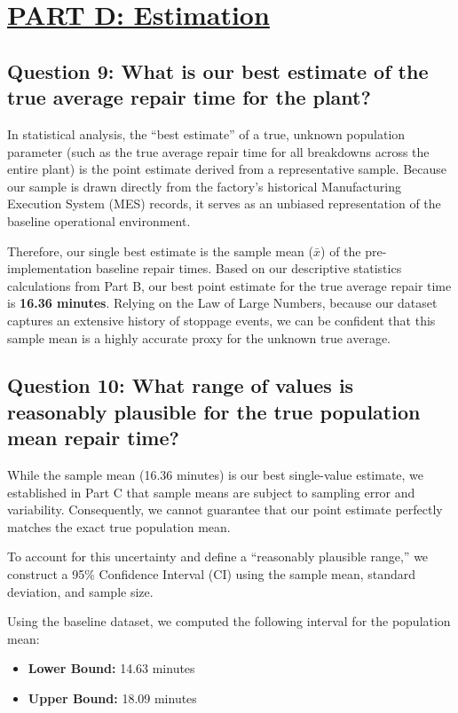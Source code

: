 \section*{\underline{PART D: Estimation}}


\subsection*{Question 9: What is our best estimate of the true average repair time for the plant?}

In statistical analysis, the ``best estimate'' of a true, unknown population parameter (such as the true average repair time for all breakdowns across the entire plant) is the point estimate derived from a representative sample. Because our sample is drawn directly from the factory's historical Manufacturing Execution System (MES) records, it serves as an unbiased representation of the baseline operational environment. 

Therefore, our single best estimate is the sample mean ($\bar{x}$) of the pre-implementation baseline repair times. Based on our descriptive statistics calculations from Part B, our best point estimate for the true average repair time is \textbf{16.36 minutes}. Relying on the Law of Large Numbers, because our dataset captures an extensive history of stoppage events, we can be confident that this sample mean is a highly accurate proxy for the unknown true average.


\subsection*{Question 10: What range of values is reasonably plausible for the true population mean repair time?}

While the sample mean (16.36 minutes) is our best single-value estimate, we established in Part C that sample means are subject to sampling error and variability. Consequently, we cannot guarantee that our point estimate perfectly matches the exact true population mean. 

To account for this uncertainty and define a ``reasonably plausible range,'' we construct a 95\% Confidence Interval (CI) using the sample mean, standard deviation, and sample size.

Using the baseline dataset, we computed the following interval for the population mean:
\begin{itemize}
    \item \textbf{Lower Bound:} 14.63 minutes
    \item \textbf{Upper Bound:} 18.09 minutes
\end{itemize}

